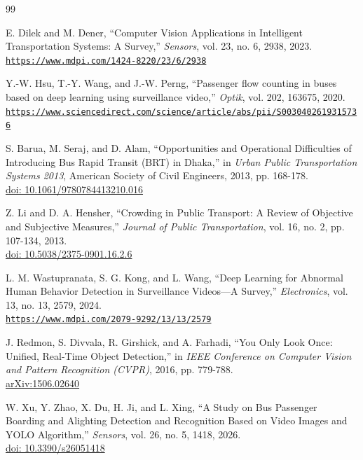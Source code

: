 \documentclass{article}
\renewcommand{\url}[1]{\href{#1}{\nolinkurl{#1}}}
\begin{document}
\FloatBarrier
\begin{thebibliography}{99}

E. Dilek and M. Dener,
``Computer Vision Applications in Intelligent Transportation Systems: A Survey,''
\textit{Sensors}, vol. 23, no. 6, 2938, 2023.\\
\url{https://www.mdpi.com/1424-8220/23/6/2938}

Y.-W. Hsu, T.-Y. Wang, and J.-W. Perng,
``Passenger flow counting in buses based on deep learning using surveillance video,''
\textit{Optik}, vol. 202, 163675, 2020.\\
\url{https://www.sciencedirect.com/science/article/abs/pii/S0030402619315736}

S. Barua, M. Seraj, and D. Alam,
``Opportunities and Operational Difficulties of Introducing Bus Rapid Transit (BRT) in Dhaka,''
in \textit{Urban Public Transportation Systems 2013}, American Society of Civil Engineers, 2013, pp. 168-178.\\
\href{https://doi.org/10.1061/9780784413210.016}{doi: 10.1061/9780784413210.016}

Z. Li and D. A. Hensher,
``Crowding in Public Transport: A Review of Objective and Subjective Measures,''
\textit{Journal of Public Transportation}, vol. 16, no. 2, pp. 107-134, 2013.\\
\href{https://doi.org/10.5038/2375-0901.16.2.6}{doi: 10.5038/2375-0901.16.2.6}

L. M. Wastupranata, S. G. Kong, and L. Wang,
``Deep Learning for Abnormal Human Behavior Detection in Surveillance Videos---A Survey,''
\textit{Electronics}, vol. 13, no. 13, 2579, 2024.\\
\url{https://www.mdpi.com/2079-9292/13/13/2579}

J. Redmon, S. Divvala, R. Girshick, and A. Farhadi,
``You Only Look Once: Unified, Real-Time Object Detection,''
in \textit{IEEE Conference on Computer Vision and Pattern Recognition (CVPR)}, 2016, pp. 779-788.\\
\href{https://arxiv.org/abs/1506.02640}{arXiv:1506.02640}

W. Xu, Y. Zhao, X. Du, H. Ji, and L. Xing,
``A Study on Bus Passenger Boarding and Alighting Detection and Recognition Based on Video Images and YOLO Algorithm,''
\textit{Sensors}, vol. 26, no. 5, 1418, 2026.\\
\href{https://doi.org/10.3390/s26051418}{doi: 10.3390/s26051418}


\end{thebibliography}
\end{document}
